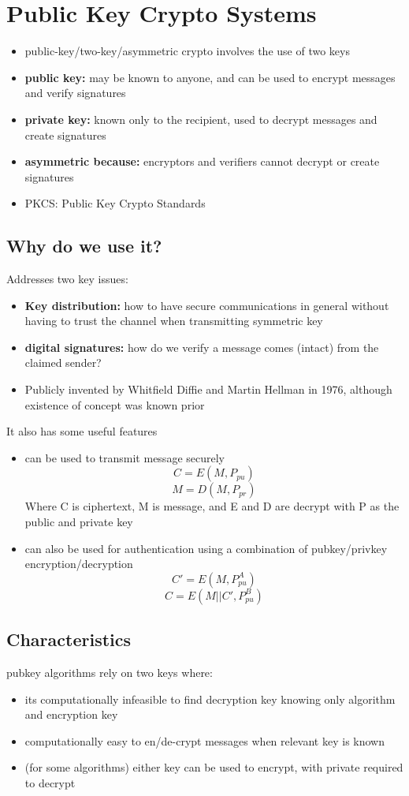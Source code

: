 \documentclass{article}
\begin{document}
\section{Public Key Crypto Systems}
\begin{itemize}
    \item public-key/two-key/asymmetric crypto involves the use of two keys
    \item \textbf{public key:} may be known to anyone, and can be used to encrypt messages and verify signatures
    \item \textbf{private key:} known only to the recipient, used to decrypt messages and create signatures
    \item \textbf{asymmetric because:} encryptors and verifiers cannot decrypt or create signatures
    \item {PKCS: Public Key Crypto Standards}
\end{itemize}
\subsection{Why do we use it?}
Addresses two key issues:
\begin{itemize}
    \item \textbf{Key distribution:} how to have secure communications in general without having to trust the channel when transmitting symmetric key
    \item \textbf{digital signatures:} how do we verify a message comes (intact) from the claimed sender?
    \item Publicly invented by Whitfield Diffie and Martin Hellman in 1976, although existence of concept was known prior
\end{itemize}
It also has some useful features
\begin{itemize}
    \item can be used to transmit message securely
    $$C = E(M,P_{pu})$$
    $$M = D(M,P_{pr})$$
    Where C is ciphertext, M is message, and E and D are decrypt with P as the public and private key
    \item can also be used for authentication using a combination of pubkey/privkey encryption/decryption
    $$C' = E(M,P^{A}_{pu})$$
    $$C = E(M||C',P^{B}_{pu})$$
\end{itemize}
\subsection{Characteristics}
pubkey algorithms rely on two keys where:
\begin{itemize}
    \item its computationally infeasible to find decryption key knowing only algorithm and encryption key
    \item computationally easy to en/de-crypt messages when relevant key is known
    \item (for some algorithms) either key can be used to encrypt, with private required to decrypt
\end{itemize}
\end{document}
